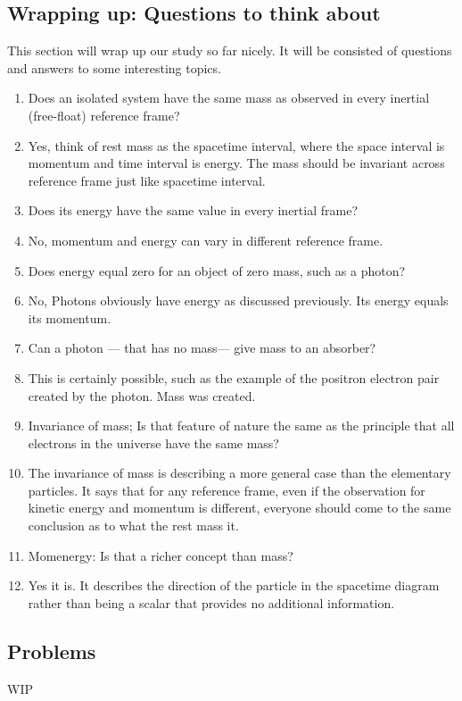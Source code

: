 \documentclass[11pt,letterpaper]{book}
\begin{document}
\subsection{Wrapping up: Questions to think about}
This section will wrap up our study so far nicely. It will be consisted of questions and answers to some interesting topics. 
\begin{enumerate}

    \item Does an isolated system have the same mass as observed in every inertial (free-float) reference frame?
    \item[Answer:] Yes, think of rest mass as the spacetime interval, where the space interval is momentum and time interval is energy. The mass should be invariant across reference frame just like spacetime interval.
    \item Does its energy have the same value in every inertial frame?
    \item[Answer:]No, momentum and energy can vary in different reference frame. 
    \item Does energy equal zero for an object of zero mass, such as a photon?
    \item[Answer:]No, Photons obviously have energy as discussed previously. Its energy equals its momentum. 
    \item Can a photon — that has no mass— give mass to an absorber?
    \item[Answer:] This is certainly possible, such as the example of the positron electron pair created by the photon. Mass was created. 
    \item Invariance of mass; Is that feature of nature the same as the principle that all electrons in the universe have the same mass?
    \item[Answer:] The invariance of mass is describing a more general case than the elementary particles. It says that for any reference frame, even if the observation for kinetic energy and momentum is different, everyone should come to the same conclusion as to what the rest mass it.
    \item Momenergy: Is that a richer concept than mass?
    \item[Answer:] Yes it is. It describes the direction of the particle in the spacetime diagram rather than being a scalar that provides no additional information. 
\end{enumerate}

\subsection{Problems}
WIP
\end{document}
